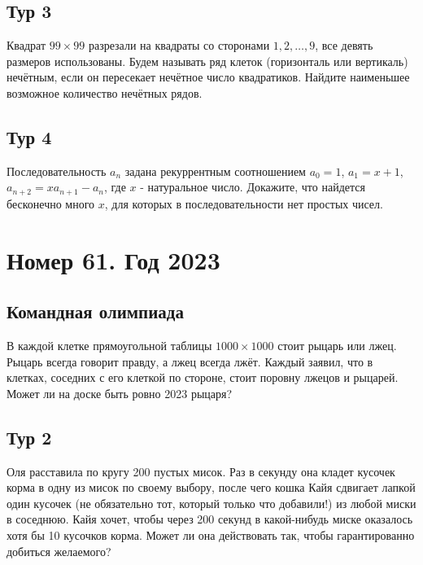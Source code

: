 \documentclass[11pt, a4paper]{common/document_template}
\begin{document}
\section{Тур 3}

\begin{exercise}
Квадрат $99 \times 99$ разрезали на квадраты со сторонами $1, 2, \dots, 9$, все девять размеров использованы. Будем называть ряд клеток (горизонталь или вертикаль) нечётным, если он пересекает нечётное число квадратиков. Найдите наименьшее возможное количество нечётных рядов.
\end{exercise}

\section{Тур 4}

\begin{exercise}
Последовательность $a_{n}$ задана рекуррентным соотношением $a_{0} = 1$, $a_{1} = x + 1$, $a_{n+2} = xa_{n+1} - a_{n}$, где $x$ - натуральное число. Докажите, что найдется бесконечно много $x$, для которых в последовательности нет простых чисел.
\end{exercise}

\chapter{Номер 61. Год 2023}

\section{Командная олимпиада}

\begin{exercise}
В каждой клетке прямоугольной таблицы $1000 \times 1000$ стоит рыцарь или лжец. Рыцарь всегда говорит правду, а лжец всегда лжёт. Каждый заявил, что в клетках, соседних с его клеткой по стороне, стоит поровну лжецов и рыцарей. Может ли на доске быть ровно 2023 рыцаря?
\end{exercise}

\section{Тур 2}

\begin{exercise}
Оля расставила по кругу 200 пустых мисок. Раз в секунду она кладет кусочек
корма в одну из мисок по своему выбору, после чего кошка Кайя сдвигает лапкой один кусочек (не обязательно тот, который только что добавили!) из любой миски в соседнюю. Кайя хочет, чтобы через 200 секунд в какой-нибудь миске оказалось хотя бы 10 кусочков корма. Может ли она действовать так, чтобы гарантированно добиться желаемого?
\end{exercise}
\end{document}
